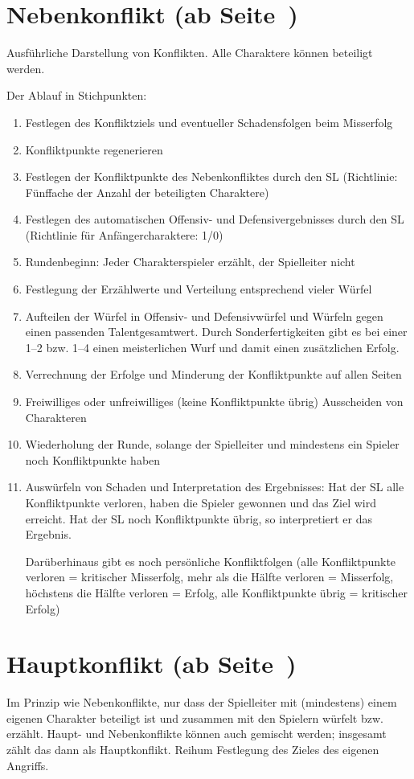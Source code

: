 \section[Nebenkonflikt]{Nebenkonflikt (ab Seite~\pageref{Sec:Nebenkonflikt})}
Ausführliche Darstellung von Konflikten. Alle Charaktere können beteiligt werden.

Der Ablauf in Stichpunkten:
\begin{enumerate}
\item Festlegen des Konfliktziels und eventueller Schadensfolgen beim Misserfolg
\item Konfliktpunkte regenerieren
\item Festlegen der Konfliktpunkte des Nebenkonfliktes durch den SL (Richtlinie: Fünffache der Anzahl der beteiligten Charaktere)
\item Festlegen des automatischen Offensiv- und Defensivergebnisses durch den SL (Richtlinie für Anfängercharaktere: 1/0)
\item Rundenbeginn: Jeder Charakterspieler erzählt, der Spielleiter nicht
\item Festlegung der Erzählwerte und Verteilung entsprechend vieler Würfel
\item Aufteilen der Würfel in Offensiv- und Defensivwürfel und Würfeln gegen einen passenden Talentgesamtwert. Durch Sonderfertigkeiten gibt es bei einer 1--2 bzw. 1--4 einen meisterlichen Wurf und damit einen zusätzlichen Erfolg.
\item Verrechnung der Erfolge und Minderung der Konfliktpunkte auf allen Seiten
\item Freiwilliges oder unfreiwilliges (keine Konfliktpunkte übrig) Ausscheiden von Charakteren
\item Wiederholung der Runde, solange der Spielleiter und mindestens ein Spieler noch Konfliktpunkte haben
\item Auswürfeln von Schaden und Interpretation des Ergebnisses: Hat der SL alle Konfliktpunkte verloren, haben die Spieler gewonnen und das Ziel wird erreicht. Hat der SL noch Konfliktpunkte übrig, so interpretiert er das Ergebnis.

Darüberhinaus gibt es noch persönliche Konfliktfolgen (alle Konfliktpunkte verloren = kritischer Misserfolg, mehr als die Hälfte verloren = Misserfolg, höchstens die Hälfte verloren = Erfolg, alle Konfliktpunkte übrig = kritischer Erfolg)
\end{enumerate}

\section[Hauptkonflikt]{Hauptkonflikt (ab Seite~\pageref{Sec:Hauptkonflikt})}
Im Prinzip wie Nebenkonflikte, nur dass der Spielleiter mit (mindestens) einem eigenen Charakter beteiligt ist und zusammen mit den Spielern würfelt bzw. erzählt. Haupt- und Nebenkonflikte können auch gemischt werden; insgesamt zählt das dann als Hauptkonflikt. Reihum Festlegung des Zieles des eigenen Angriffs.

